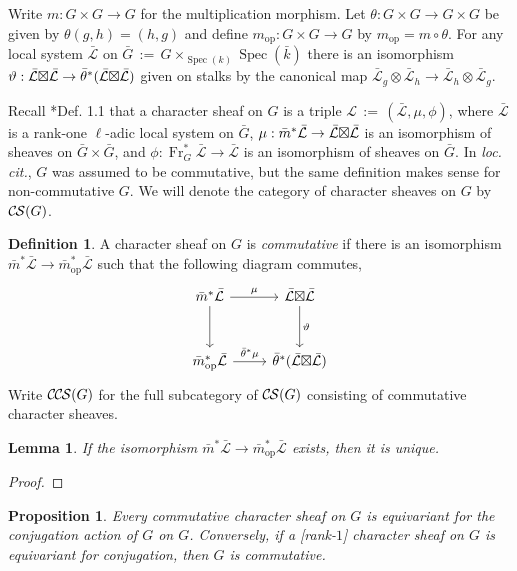 \documentclass[10pt]{amsart}
\theoremstyle{plain}
\newtheorem{proposition}[theorem]{Proposition}
\newtheorem{lemma}[theorem]{Lemma}
\theoremstyle{definition}
\newtheorem{definition}[theorem]{Definition}
\newcommand{\bFq}{\bar{k}}
\newcommand{\Fq}{k}
\newcommand{\Frob}[1]{\operatorname{Fr}_{#1}}
\newcommand{\Spec}[1]{{\operatorname{Spec}(#1)}}
\newcommand{\op}{_{\operatorname{op}}}
\newcommand{\ceq}{{\, :=\, }}
\newcommand{\cs}[1]{{\mathcal{#1}}}
\newcommand{\gcs}[1]{{\mathcal{\bar #1}}}
\newcommand{\CS}{{\mathcal{C\hskip-0.8pt S}}}
\newcommand{\CCS}{{\mathcal{C\hskip-.8pt C\hskip-0.8pt S}}}
\newcommand{\bm}{\bar{m}}
\newcommand{\bG}{\bar{G}}
\newcommand{\tight}[3]{\hspace{-#1pt}{#2}\hspace{-#3pt}}
\newcommand{\LxL}{\text{$\gcs{L} \tight{0}{\boxtimes}{0} \gcs{L}$}}
\begin{document}
Write $m : G \times G \to G$ for the multiplication morphism.
Let $\theta : G\times G \to G\times G$ be given by $\theta(g,h) = (h,g)$
and define $m\op : G \times G \to G$ by $m\op = m \circ \theta$.
For any local system $\gcs{L}$ on $\bG \ceq G \times_{\Spec{\Fq}} \Spec{\bFq}$ there is an isomorphism
$\vartheta : \LxL \to {\bar \theta}^*(\LxL)$ given on stalks by the canonical map
$\gcs{L}_{g} \otimes \gcs{L}_{h} \to \gcs{L}_{h} \otimes \gcs{L}_{g}$.

Recall \cite{cunningham-roe:13a}*{Def. 1.1} that a character sheaf on $G$ is a triple $\cs{L} \ceq (\gcs{L}, \mu, \phi)$,
where $\gcs{L}$ is a rank-one $\ell$-adic local system on $\bG$, $\mu : \bm^* \gcs{L} \to \LxL$ is an isomorphism
of sheaves on $\bG \times \bG$, and $\phi : \Frob{G}^* \gcs{L} \to \gcs{L}$ is an isomorphism of sheaves on $\bG$.
In \emph{loc. cit.}, $G$ was assumed to be commutative, but the same definition makes sense for non-commutative $G$.
We will denote the category of character sheaves on $G$ by $\CS(G)$.

\begin{definition}\label{def:CCS}
A character sheaf on $G$ is \emph{commutative} if there is an isomorphism ${\bar m}^* \gcs{L} \to {\bar m}\op^* \gcs{L}$
such that the following diagram commutes,
  \[
  \begin{tikzcd}[row sep=30]
   \bm^*\gcs{L} \arrow{d} \arrow{r}{\mu} & \LxL \arrow{d}{\vartheta}\\
   \bm\op^*\gcs{L} \arrow{r}{{\bar \theta}^*\mu} &  {\bar \theta}^*(\LxL)
  \end{tikzcd}
  \]
 Write $\CCS(G)$ for the full subcategory of $\CS(G)$ consisting of commutative character sheaves.
 \end{definition}
 

\begin{lemma}
If the isomorphism ${\bar m}^* \gcs{L} \to {\bar m}\op^* \gcs{L}$ exists, then it is unique.
\end{lemma}
\begin{proof}
\end{proof}

\begin{proposition}
Every commutative character sheaf on $G$ is equivariant for the conjugation action of $G$ on $G$. Conversely, if a [rank-$1$] character sheaf on $G$ is equivariant for conjugation, then $G$ is commutative. 
\end{proposition}
\end{document}
